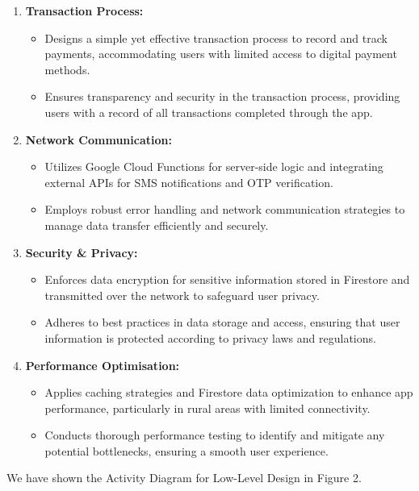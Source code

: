 \documentclass{article}
\begin{document}
\begin{enumerate}
    \item \textbf{Transaction Process:}
    \begin{itemize}
        \item Designs a simple yet effective transaction process to record and track payments, accommodating users with limited access to digital payment methods.
        \item Ensures transparency and security in the transaction process, providing users with a record of all transactions completed through the app.
    \end{itemize}
    
    \item \textbf{Network Communication:}
    \begin{itemize}
        \item Utilizes Google Cloud Functions for server-side logic and integrating external APIs for SMS notifications and OTP verification.
        \item Employs robust error handling and network communication strategies to manage data transfer efficiently and securely.
    \end{itemize}
    
    \item \textbf{Security \& Privacy:}
    \begin{itemize}
        \item Enforces data encryption for sensitive information stored in Firestore and transmitted over the network to safeguard user privacy.
        \item Adheres to best practices in data storage and access, ensuring that user information is protected according to privacy laws and regulations.
    \end{itemize}
    
    \item \textbf{Performance Optimisation:}
    \begin{itemize}
        \item Applies caching strategies and Firestore data optimization to enhance app performance, particularly in rural areas with limited connectivity.
        \item Conducts thorough performance testing to identify and mitigate any potential bottlenecks, ensuring a smooth user experience.
    \end{itemize}
\end{enumerate}
We have shown the Activity Diagram for Low-Level Design in Figure 2.
\end{document}
